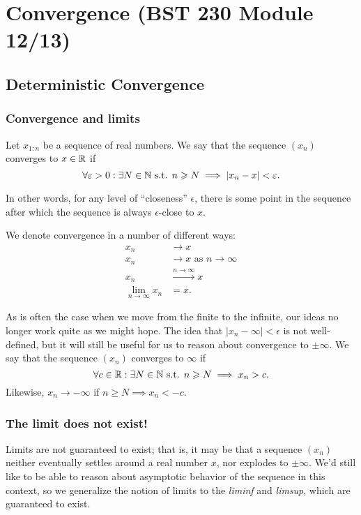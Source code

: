 \section{Convergence (BST 230 Module 12/13)}

\subsection{Deterministic Convergence}

\subsubsection{Convergence and limits}
Let $x_{1:n}$ be a sequence of real numbers. We say that the sequence $(x_n)$
converges to $x \in \mathbb R$ if 
\[
    \forall \varepsilon > 0:
    \exists N \in \mathbb N \text{ s.t. }
    n \geqslant N \implies |x_n - x| < \varepsilon. 
\]

In other words, for any level of ``closeness'' $\epsilon$, there is some point in the 
sequence after which the sequence is always $\epsilon$-close to $x$.

We denote convergence in a number of different ways:
\begin{align*}
    x_n &\rightarrow x \\
    x_n &\rightarrow x \text{ as } n \rightarrow \infty \\
    x_n &\stackrel{n \rightarrow \infty}{ \rightarrow } x \\
    \lim_{n \rightarrow \infty} x_n &= x.
\end{align*}

As is often the case when we move from the finite to the infinite,
our ideas no longer work quite as we might hope. 
The idea that $|x_n - \infty| < \epsilon$
is not well-defined, but it will still be useful for us to reason about 
convergence to $\pm \infty$. We say that the sequence $(x_n)$ converges to $\infty$ 
if 
\[
    \forall c \in \mathbb R:
    \exists N \in \mathbb N \text{ s.t. }
    n \geqslant N \implies x_n > c.
\]
Likewise, $x_n \rightarrow -\infty$ if $n \geq N \implies x_n < -c$.

\subsubsection{The limit does not exist!}

Limits are not guaranteed to exist; that is, it may be that a sequence $(x_n)$ 
neither eventually settles around a real number $x$, nor explodes to $\pm \infty$.
We'd still like to be able to reason about asymptotic behavior of the sequence 
in this context, so we generalize the notion of limits to the \emph{liminf}
and \emph{limsup}, which are guaranteed to exist.

